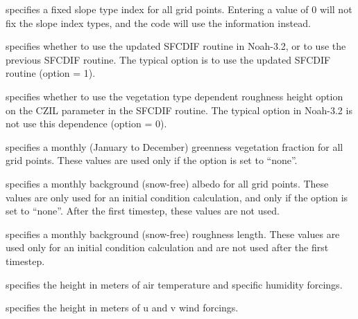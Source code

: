   specifies a fixed slope
 type index for all grid points.  Entering a value of 0 will
 not fix the slope index types, and the code will use the
  information instead.

  specifies whether to use the updated
 SFCDIF routine in Noah-3.2, or to use the previous SFCDIF routine.
 The typical option is to use the updated SFCDIF routine (option = 1).

  specifies whether
 to use the vegetation type dependent roughness height option
 on the CZIL parameter in the SFCDIF routine.  The typical option
 in Noah-3.2 is not use this dependence (option = 0).

  specifies a monthly (January
 to December) greenness vegetation fraction for all grid points.
 These values are used only if the 
 option is set to ``none''.

  specifies a monthly background
 (snow-free) albedo for all grid points.  These values are only
 used for an initial condition calculation, and only if the
  option is set to ``none''.  After
 the first timestep, these values are not used.

  specifies a monthly
 background (snow-free) roughness length.  These values are used
 only for an initial condition calculation and are not used after
 the first timestep.

  specifies the
 height in meters of air temperature and specific humidity forcings.

  specifies the
 height in meters of u and v wind forcings.
 

